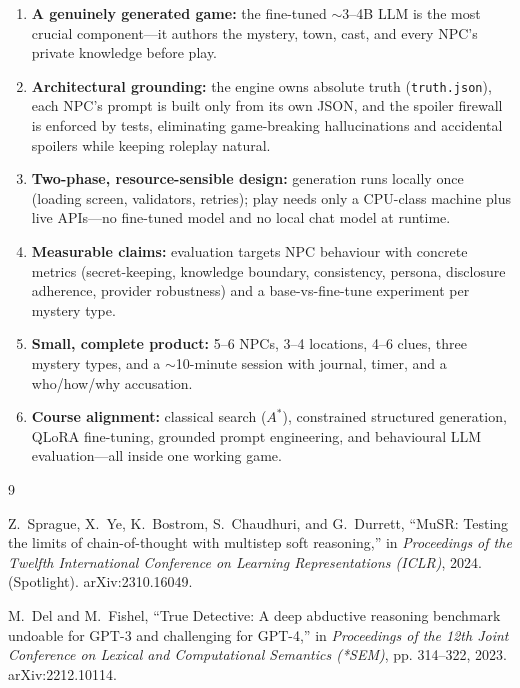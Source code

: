 \documentclass[11pt,a4paper]{article}
\begin{document}
\begin{enumerate}
    \item \textbf{A genuinely generated game:} the fine-tuned $\sim$3--4B LLM is the most crucial component---it authors the mystery, town, cast, and every NPC's private knowledge before play.
    \item \textbf{Architectural grounding:} the engine owns absolute truth (\texttt{truth.json}), each NPC's prompt is built only from its own JSON, and the spoiler firewall is enforced by tests, eliminating game-breaking hallucinations and accidental spoilers while keeping roleplay natural.
    \item \textbf{Two-phase, resource-sensible design:} generation runs locally once (loading screen, validators, retries); play needs only a CPU-class machine plus live APIs---no fine-tuned model and no local chat model at runtime.
    \item \textbf{Measurable claims:} evaluation targets NPC behaviour with concrete metrics (secret-keeping, knowledge boundary, consistency, persona, disclosure adherence, provider robustness) and a base-vs-fine-tune experiment per mystery type.
    \item \textbf{Small, complete product:} 5--6 NPCs, 3--4 locations, 4--6 clues, three mystery types, and a $\sim$10-minute session with journal, timer, and a who/how/why accusation.
    \item \textbf{Course alignment:} classical search ($A^*$), constrained structured generation, QLoRA fine-tuning, grounded prompt engineering, and behavioural LLM evaluation---all inside one working game.
\end{enumerate}

\begin{thebibliography}{9}

Z.~Sprague, X.~Ye, K.~Bostrom, S.~Chaudhuri, and G.~Durrett,
\newblock ``MuSR: Testing the limits of chain-of-thought with multistep soft reasoning,''
\newblock in \emph{Proceedings of the Twelfth International Conference on Learning Representations (ICLR)}, 2024. (Spotlight). arXiv:2310.16049.

M.~Del and M.~Fishel,
\newblock ``True Detective: A deep abductive reasoning benchmark undoable for GPT-3 and challenging for GPT-4,''
\newblock in \emph{Proceedings of the 12th Joint Conference on Lexical and Computational Semantics (*SEM)}, pp. 314--322, 2023. arXiv:2212.10114.

\end{thebibliography}
\end{document}
